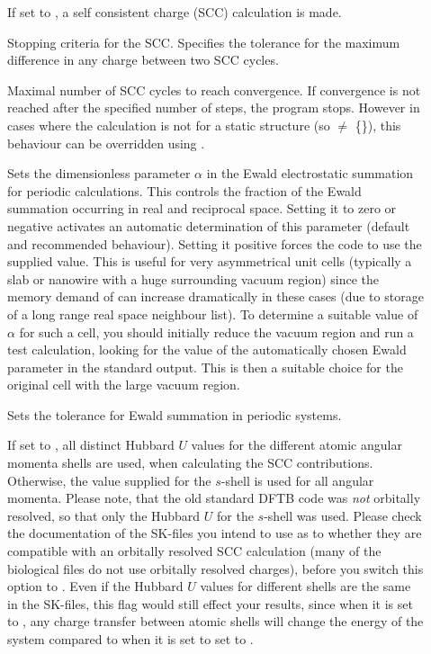 \begin{description}
\item[] If set to , a self consistent charge (SCC)
  calculation is made.

\item[] Stopping criteria for the SCC.  Specifies the
  tolerance for the maximum difference in any charge between two SCC
  cycles.

\item[] Maximal number of SCC cycles to reach
  convergence. If convergence is not reached after the specified
  number of steps, the program stops. However in cases where the
  calculation is not for a static structure (so  $\neq$
  \{\}), this behaviour can be overridden using
  .

\item[] Sets the dimensionless parameter $\alpha$
  in the Ewald electrostatic summation for periodic calculations. This
  controls the fraction of the Ewald summation occurring in real and
  reciprocal space. Setting it to zero or negative activates an
  automatic determination of this parameter (default and recommended
  behaviour). Setting it positive forces the code to use the supplied
  value. This is useful for very asymmetrical unit cells
  (typically a slab or nanowire with a huge surrounding vacuum region)
  since the memory demand of \dftbp{} can increase dramatically in
  these cases (due to storage of a long range real space neighbour
  list). To determine a suitable value of $\alpha$ for such a cell,
  you should initially reduce the vacuum region and run a test
  calculation, looking for the value of the automatically chosen Ewald
  parameter in the standard output. This is then a suitable choice for
  the original cell with the large vacuum region.

\item[] Sets the tolerance for Ewald summation in periodic
  systems.

\item[] If set to , all distinct
  Hubbard $U$ values for the different atomic angular momenta shells
  are used, when calculating the SCC contributions. Otherwise, the
  value supplied for the $s$-shell is used for all angular
  momenta. Please note, that the old standard DFTB code was \emph{not}
  orbitally resolved, so that only the Hubbard $U$ for the $s$-shell
  was used. Please check the documentation of the SK-files you intend
  to use as to whether they are compatible with an orbitally resolved
  SCC calculation (many of the biological files do not use orbitally
  resolved charges), before you switch this option to . Even
  if the Hubbard $U$ values for different shells are the same in the
  SK-files, this flag would still effect your results, since when it
  is set to , any charge transfer between atomic shells will
  change the energy of the system compared to when it is set to set to
  .


\end{description}
